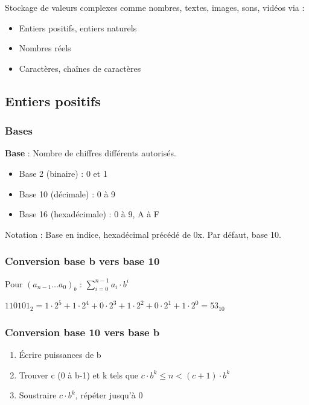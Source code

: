 \documentclass[12pt,a4paper]{article}
\begin{document}
\begin{remarque}
Stockage de valeurs complexes comme nombres, textes, images, sons, vidéos via :
\begin{itemize}
    \item Entiers positifs, entiers naturels
    \item Nombres réels
    \item Caractères, chaînes de caractères
\end{itemize}
\end{remarque}

\subsection{Entiers positifs}

\subsubsection{Bases}
\begin{definition}
\textbf{Base} : Nombre de chiffres différents autorisés.
\begin{itemize}
    \item Base 2 (binaire) : 0 et 1
    \item Base 10 (décimale) : 0 à 9
    \item Base 16 (hexadécimale) : 0 à 9, A à F
\end{itemize}
\end{definition}

\begin{remarque}
Notation : Base en indice, hexadécimal précédé de 0x. Par défaut, base 10.
\end{remarque}

\subsubsection{Conversion base b vers base 10}
\begin{methode}
Pour $(a_{n-1} \dots a_0)_b$ : $\sum_{i=0}^{n-1} a_i \cdot b^i$
\end{methode}

\begin{exemple}
$110101_2 = 1\cdot2^5 + 1\cdot2^4 + 0\cdot2^3 + 1\cdot2^2 + 0\cdot2^1 + 1\cdot2^0 = 53_{10}$
\end{exemple}

\subsubsection{Conversion base 10 vers base b}
\begin{methode}
\begin{enumerate}
    \item Écrire puissances de b
    \item Trouver c (0 à b-1) et k tels que $c \cdot b^k \leq n < (c+1) \cdot b^k$
    \item Soustraire $c \cdot b^k$, répéter jusqu'à 0
\end{enumerate}
\end{methode}
\end{document}
